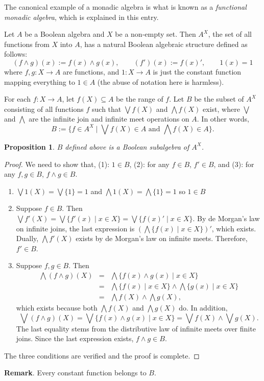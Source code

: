 \documentclass[12pt]{article}
\newtheorem{prop}{Proposition}
\begin{document}
The canonical example of a monadic algebra is what is known as a \emph{functional monadic algebra}, which is explained in this entry.

Let $A$ be a Boolean algebra and $X$ be a non-empty set.  Then $A^X$, the set of all functions from $X$ into $A$, has a natural Boolean algebraic structure defined as follows:
$$(f\wedge g)(x):=f(x)\wedge g(x),\qquad (f')(x):=f(x)',\qquad 1(x)=1$$
where $f,g:X\to A$ are functions, and $1:X\to A$ is just the constant function mapping everything to $1\in A$ (the abuse of notation here is harmless).

For each $f:X\to A$, let $f(X)\subseteq A$ be the range of $f$.  Let $B$ be the subset of $A^X$ consisting of all functions $f$ such that $\bigvee f(X)$ and $\bigwedge f(X)$ exist, where $\bigvee$ and $\bigwedge$ are the infinite join and infinite meet operations on $A$.  In other words, $$B:=\lbrace f\in A^X\mid \bigvee f(X)\in A\mbox{ and }\bigwedge f(X)\in A\rbrace.$$
\begin{prop} $B$ defined above is a Boolean subalgebra of $A^X$. \end{prop}
\begin{proof}
We need to show that, (1): $1\in B$, (2): for any $f\in B$, $f'\in B$, and (3): for any $f,g\in B$, $f\wedge g\in B$.
\begin{enumerate}
\item $\bigvee 1(X)=\bigvee \lbrace 1\rbrace =1$ and $\bigwedge 1(X)=\bigwedge \lbrace 1\rbrace =1$ so $1\in B$
\item Suppose $f\in B$.  Then $\bigvee f'(X)=\bigvee \lbrace f'(x)\mid x\in X\rbrace = \bigvee \lbrace f(x)'\mid x\in X\rbrace$.  By de Morgan's law on infinite joins, the last expression is $(\bigwedge \lbrace f(x)\mid x\in X\rbrace )'$, which exists.  Dually, $\bigwedge f'(X)$ exists by de Morgan's law on infinite meets.  Therefore, $f'\in B$.
\item Suppose $f,g\in B$.  Then 
\begin{eqnarray*}
\bigwedge (f\wedge g)(X) &=& \bigwedge \lbrace f(x)\wedge g(x)\mid x\in X\rbrace \\ 
&=& \bigwedge \lbrace f(x)\mid x\in X\rbrace \wedge \bigwedge \lbrace g(x) \mid x\in X\rbrace \\ 
&=& \bigwedge f(X)\wedge \bigwedge g(X),
\end{eqnarray*} 
which exists because both $\bigwedge f(X)$ and $\bigwedge g(X)$ do.  In addition, $$\bigvee (f\wedge g)(X)=\bigvee \lbrace f(x)\wedge g(x)\mid x\in X\rbrace =\bigvee f(X)\wedge \bigvee g(X).$$  The last equality stems from the distributive law of infinite meets over finite joins.  Since the last expression exists, $f\wedge g \in B$.
\end{enumerate}
The three conditions are verified and the proof is complete.
\end{proof}
\textbf{Remark}.  Every constant function belongs to $B$.
\end{document}
